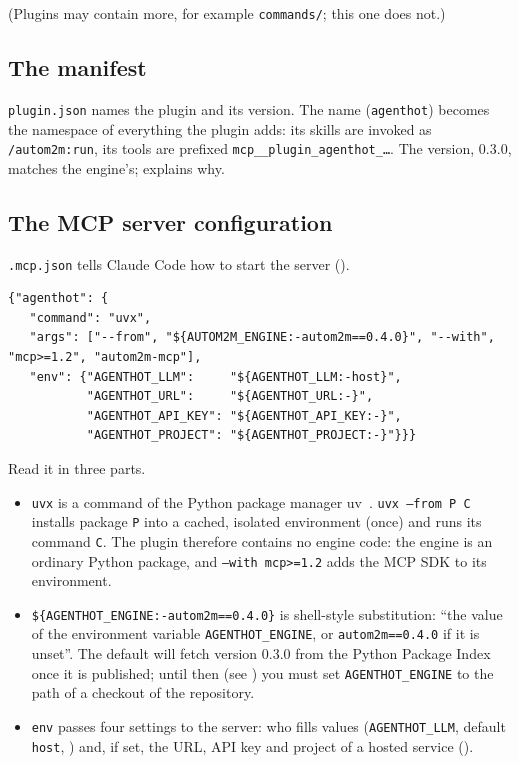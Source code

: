 \documentclass[10pt,a4paper]{article}
\newcommand{\cc}{Claude Code}
\newcommand{\code}[1]{\texttt{#1}}
\newcommand{\file}[1]{\texttt{#1}}
\newcommand{\skill}[1]{\texttt{/autom2m:#1}}
\begin{document}
(Plugins may contain more, for example \file{commands/}; this one does not.)

\subsection{The manifest}

\file{plugin.json} names the plugin and its version. The name
(\code{agenthot}) becomes the namespace of everything the plugin adds: its
skills are invoked as \skill{run}, its tools are prefixed
\code{mcp\_\_plugin\_agenthot\_\ldots}. The version, 0.3.0, matches the
engine's;  explains why.

\subsection{The MCP server configuration}

\file{.mcp.json} tells \cc{} how to start the server ().

\begin{lstlisting}[style=raw, caption={Code excerpt: \file{plugin/autom2m/.mcp.json}.}, label={lst:mcpjson}]
{"agenthot": {
   "command": "uvx",
   "args": ["--from", "${AUTOM2M_ENGINE:-autom2m==0.4.0}", "--with", "mcp>=1.2", "autom2m-mcp"],
   "env": {"AGENTHOT_LLM":     "${AGENTHOT_LLM:-host}",
           "AGENTHOT_URL":     "${AGENTHOT_URL:-}",
           "AGENTHOT_API_KEY": "${AGENTHOT_API_KEY:-}",
           "AGENTHOT_PROJECT": "${AGENTHOT_PROJECT:-}"}}}
\end{lstlisting}

Read it in three parts.

\begin{itemize}
\item \code{uvx} is a command of the Python package manager
uv~\cite{uvdocs}. \code{uvx --from P C} installs package \code{P} into a
cached, isolated environment (once) and runs its command \code{C}. The
plugin therefore contains no engine code: the engine is an ordinary Python
package, and \code{--with mcp>=1.2} adds the MCP SDK to its environment.
\item \code{\$\{AGENTHOT\_ENGINE:-autom2m==0.4.0\}} is shell-style
substitution: ``the value of the environment variable \code{AGENTHOT\_ENGINE},
or \code{autom2m==0.4.0} if it is unset''. The default will fetch version
0.3.0 from the Python Package Index once it is published; until then (see
) you must set \code{AGENTHOT\_ENGINE} to the path of
a checkout of the repository.
\item \code{env} passes four settings to the server: who fills values
(\code{AGENTHOT\_LLM}, default \code{host}, ) and, if set,
the URL, API key and project of a hosted service ().
\end{itemize}
\end{document}
